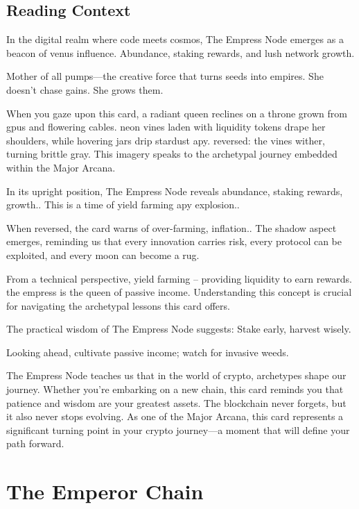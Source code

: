 \documentclass[11pt,oneside]{book}
\begin{document}
\begin{minipage}[t]{0.55\textwidth}
  \subsection*{Reading Context}
  In the digital realm where code meets cosmos, The Empress Node emerges as a beacon of venus influence. Abundance, staking rewards, and lush network growth.

  Mother of all pumps—the creative force that turns seeds into empires. She doesn't chase gains. She grows them.

  When you gaze upon this card, a radiant queen reclines on a throne grown from gpus and flowering cables. neon vines laden with liquidity tokens drape her shoulders, while hovering jars drip stardust apy. reversed: the vines wither, turning brittle gray. This imagery speaks to the archetypal journey embedded within the Major Arcana.

  In its upright position, The Empress Node reveals abundance, staking rewards, growth.. This is a time of yield farming apy explosion..

  When reversed, the card warns of over-farming, inflation.. The shadow aspect emerges, reminding us that every innovation carries risk, every protocol can be exploited, and every moon can become a rug.

  From a technical perspective, yield farming – providing liquidity to earn rewards. the empress is the queen of passive income. Understanding this concept is crucial for navigating the archetypal lessons this card offers.

  The practical wisdom of The Empress Node suggests: Stake early, harvest wisely.

  Looking ahead, cultivate passive income; watch for invasive weeds.

  The Empress Node teaches us that in the world of crypto, archetypes shape our journey. Whether you're embarking on a new chain, this card reminds you that patience and wisdom are your greatest assets. The blockchain never forgets, but it also never stops evolving. As one of the Major Arcana, this card represents a significant turning point in your crypto journey—a moment that will define your path forward.

\end{minipage}

\newpage
\section*{The Emperor Chain}
\end{document}
